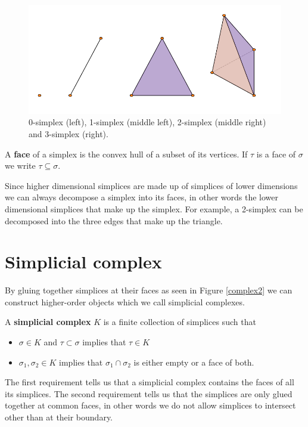 \begin{figure}
  \centering
  \includegraphics[]{simplex.pdf}
  \caption{
  \label{simplices}
0-simplex (left), 1-simplex (middle left), 2-simplex (middle right) and 3-simplex (right).}
  \end{figure}
\begin{definition}
A \textbf{face} of a simplex is the convex hull of a subset of its vertices. If $\tau$ is a face of $\sigma$ we write $\tau \subseteq \sigma$.
\end{definition}
Since higher dimensional simplices are made up of simplices of lower dimensions we can always decompose a simplex into its faces, in other words the lower dimensional simplices that make up the simplex. For example, a 2-simplex can be decomposed into the three edges that make up the triangle.
\section{Simplicial complex}
By gluing together simplices at their faces as seen in Figure \ref{complex2} we can construct higher-order objects which we call simplicial complexes.
\begin{definition} \label{defsimcomp}
A \textbf{simplicial complex} $K$ is a finite collection of simplices such that

\begin{itemize}
    \item $\sigma \in K$ and $\tau \subset \sigma$ implies that $\tau \in K$
    \item $\sigma_{1}, \sigma_{2} \in K$ implies that $\sigma_{1} \cap \sigma_{2}$ is either empty or a face of both.
\end{itemize}

\end{definition}
The first requirement tells us that a simplicial complex contains the faces of all its simplices. The second requirement tells us that the simplices are only glued together at common faces, in other words we do not allow simplices to intersect other than at their boundary.


